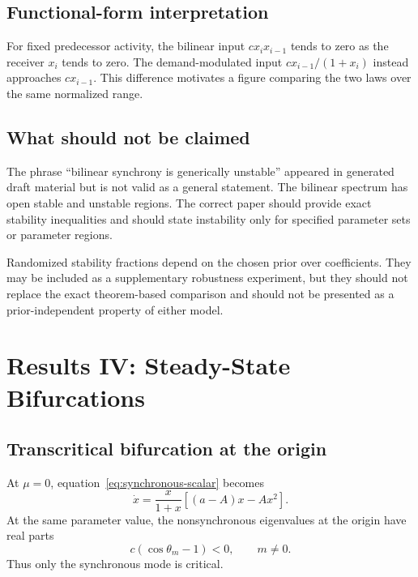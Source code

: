 \documentclass[11pt, reqno]{amsart}
\theoremstyle{definition}
\theoremstyle{remark}
\begin{document}
	\subsection{Functional-form interpretation}
	
	For fixed predecessor activity, the bilinear input $c x_i x_{i-1}$ tends to zero
	as the receiver $x_i$ tends to zero.  The demand-modulated input
	$c x_{i-1}/(1+x_i)$ instead approaches $c x_{i-1}$.  This difference motivates
	a figure comparing the two laws over the same normalized range.
	
	
	\subsection{What should not be claimed}
	
	The phrase ``bilinear synchrony is generically unstable'' appeared in generated
	draft material but is not valid as a general statement.  The bilinear spectrum
	has open stable and unstable regions.  The correct paper should provide exact
	stability inequalities and should state instability only for specified
	parameter sets or parameter regions.
	
	Randomized stability fractions depend on the chosen prior over coefficients.
	They may be included as a supplementary robustness experiment, but they should
	not replace the exact theorem-based comparison and should not be presented as a
	prior-independent property of either model.
	
	\section{Results IV: Steady-State Bifurcations}
	\label{sec:steady-bifurcations}
	
	\subsection{Transcritical bifurcation at the origin}
	
	At $\mu=0$, equation~\eqref{eq:synchronous-scalar} becomes
	\[
	\dot x
	=
	\frac{x}{1+x}
	\left[(a-A)x-Ax^2\right].
	\]
	At the same parameter value, the nonsynchronous eigenvalues at the origin have
	real parts
	\[
	c(\cos\theta_m-1)<0,
	\qquad m\ne0.
	\]
	Thus only the synchronous mode is critical.
	
\end{document}
